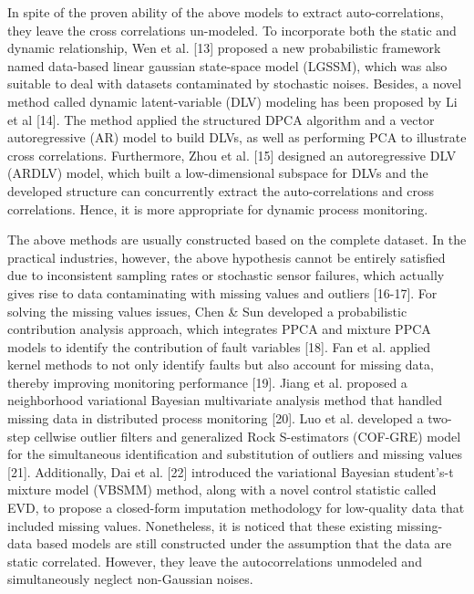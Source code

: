 \documentclass[journal]{IEEEtranTICPS}
\begin{document}
In spite of the proven ability of the above models to extract auto-correlations, they leave the cross correlations un-modeled. To incorporate both the static and dynamic relationship, Wen et al. [13] proposed a new probabilistic framework named data-based linear gaussian state-space model (LGSSM), which was also suitable to deal with datasets contaminated by stochastic noises. Besides, a novel method called dynamic latent-variable (DLV) modeling has been proposed by Li et al [14]. The method applied the structured DPCA algorithm and a vector autoregressive (AR) model to build DLVs, as well as performing PCA to illustrate cross correlations. Furthermore, Zhou et al. [15] designed an autoregressive DLV (ARDLV) model, which built a low-dimensional subspace for DLVs and the developed structure can concurrently extract the auto-correlations and cross correlations. Hence, it is more appropriate for dynamic process monitoring. 

The above methods are usually constructed based on the complete dataset. In the practical industries, however, the above hypothesis cannot be entirely satisfied due to inconsistent sampling rates or stochastic sensor failures, which actually gives rise to data contaminating with missing values and outliers [16-17]. For solving the missing values issues, Chen \& Sun developed a probabilistic contribution analysis approach, which integrates PPCA and mixture PPCA models to identify the contribution of fault variables [18]. Fan et al. applied kernel methods to not only identify faults but also account for missing data, thereby improving monitoring performance [19]. Jiang et al. proposed a neighborhood variational Bayesian multivariate analysis method that handled missing data in distributed process monitoring [20]. Luo et al. developed a two-step cellwise outlier filters and generalized Rock S-estimators (COF-GRE) model for the simultaneous identification and substitution of outliers and missing values [21]. Additionally, Dai et al. [22] introduced the variational Bayesian student's-t mixture model (VBSMM) method, along with a novel control statistic called EVD, to propose a closed-form imputation methodology for low-quality data that included missing values. Nonetheless, it is noticed that these existing missing-data based models are still constructed under the assumption that the data are static correlated. However, they leave the autocorrelations unmodeled and simultaneously neglect non-Gaussian noises.
\end{document}
